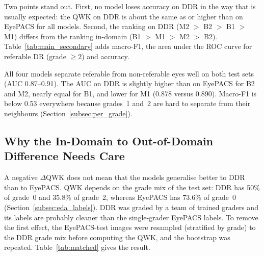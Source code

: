Two points stand out. First, no model loses accuracy on DDR in the way that is usually expected: the QWK on DDR is about the same as or higher than on EyePACS for all models. Second, the ranking on DDR (M2 $>$ B2 $>$ B1 $>$ M1) differs from the ranking in-domain (B1 $>$ M1 $>$ M2 $>$ B2). Table~\ref{tab:main_secondary} adds macro-F1, the area under the ROC curve for referable DR (grade $\geq 2$) and accuracy.

\begin{table}[htbp]
    \centering
    \caption{Secondary metrics on both test sets (5-epoch runs). Accuracy is reported for completeness; it is dominated by grade~0.}
    \label{tab:main_secondary}
    \footnotesize
    
\end{table}

All four models separate referable from non-referable eyes well on both test sets (AUC 0.87--0.91). The AUC on DDR is slightly higher than on EyePACS for B2 and M2, nearly equal for B1, and lower for M1 (0.878 versus 0.890). Macro-F1 is below 0.53 everywhere because grades~1 and~2 are hard to separate from their neighbours (Section~\ref{subsec:per_grade}).

\subsection{Why the In-Domain to Out-of-Domain Difference Needs Care}
\label{subsec:matched}

A negative $\Delta$QWK does not mean that the models generalise better to DDR than to EyePACS. QWK depends on the grade mix of the test set: DDR has 50\% of grade~0 and 35.8\% of grade~2, whereas EyePACS has 73.6\% of grade~0 (Section~\ref{subsec:eda_labels}). DDR was graded by a team of trained graders and its labels are probably cleaner than the single-grader EyePACS labels. To remove the first effect, the EyePACS-test images were resampled (stratified by grade) to the DDR grade mix before computing the QWK, and the bootstrap was repeated. Table~\ref{tab:matched} gives the result.

\begin{table}[htbp]
    \centering
    \caption{Prior-matched comparison: QWK on EyePACS-test resampled to the DDR grade mix, QWK on DDR-test, and the matched $\Delta$QWK with 95\% bootstrap intervals (seed-0 runs; B1 shown for seed~0).}
    \label{tab:matched}
    \small
    
\end{table}

